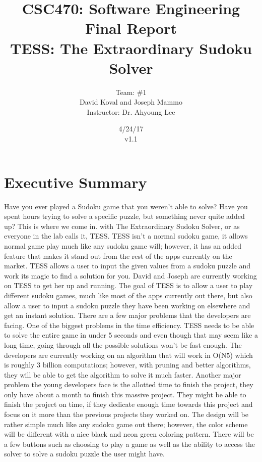 \documentclass{article}
\title{CSC470: Software Engineering Final Report\\ TESS: The Extraordinary Sudoku Solver}
\author{Team: \#1 \\David Koval and Joseph Mammo\\Instructor: Dr. Ahyoung Lee}
\date{ 4/24/17 \\ v1.1 }
\begin{document}
 
\maketitle

\clearpage

\tableofcontents

\clearpage

\section{Executive Summary} 
 Have you ever played a Sudoku game that you weren’t able to solve? Have you spent hours trying to solve a specific puzzle, but something never quite added up? This is where we come in. with The Extraordinary Sudoku Solver, or as everyone in the lab calls it, TESS. TESS isn’t a normal sudoku game, it allows normal game play much like any sudoku game will; however, it has an added feature that makes it stand out from the rest of the apps currently on the market. TESS allows a user to input the given values from a sudoku puzzle and work its magic to find a solution for you. David and Joseph are currently working on TESS to get her up and running. 
	The goal of TESS is to allow a user to play different sudoku games, much like most of the apps currently out there, but also allow a user to input a sudoku puzzle they have been working on elsewhere and get an instant solution. There are a few major problems that the developers are facing. One of the biggest problems in the time efficiency. TESS needs to be able to solve the entire game in under 5 seconds and even though that may seem like a long time, going through all the possible solutions won’t be fast enough. The developers are currently working on an algorithm that will work in O(N\^5) which is roughly 3 billion computations; however, with pruning and better algorithms, they will be able to get the algorithm to solve it much faster. Another major problem the young developers face is the allotted time to finish the project, they only have about a month to finish this massive project. They might be able to finish the project on time, if they dedicate enough time towards this project and focus on it more than the previous projects they worked on. 
	The design will be rather simple much like any sudoku game out there; however, the color scheme will be different with a nice black and neon green coloring pattern. There will be a few buttons such as choosing to play a game as well as the ability to access the solver to solve a sudoku puzzle the user might have.
\end{document}
